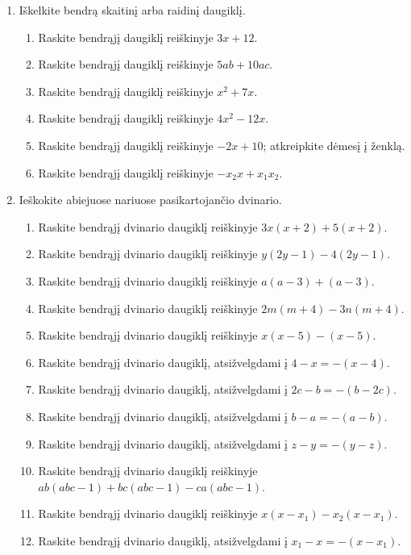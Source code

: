 \documentclass[11pt,a4paper]{scrartcl}
\begin{document}
\begin{enumerate}[label=\textbf{\arabic*.}, leftmargin=*]
    \item Iškelkite bendrą skaitinį arba raidinį daugiklį.
    \begin{enumerate}[label={(\arabic*)}]
        \item Raskite bendrąjį daugiklį reiškinyje $3x+12$.
        \item Raskite bendrąjį daugiklį reiškinyje $5ab+10ac$.
        \item Raskite bendrąjį daugiklį reiškinyje $x^2+7x$.
        \item Raskite bendrąjį daugiklį reiškinyje $4x^2-12x$.
        \item Raskite bendrąjį daugiklį reiškinyje $-2x+10$; atkreipkite dėmesį į ženklą.
        \item Raskite bendrąjį daugiklį reiškinyje $-x_2x+x_1x_2$.
    \end{enumerate}
    \item Ieškokite abiejuose nariuose pasikartojančio dvinario.
    \begin{enumerate}[label={(\arabic*)}]
        \item Raskite bendrąjį dvinario daugiklį reiškinyje $3x(x+2)+5(x+2)$.
        \item Raskite bendrąjį dvinario daugiklį reiškinyje $y(2y-1)-4(2y-1)$.
        \item Raskite bendrąjį dvinario daugiklį reiškinyje $a(a-3)+(a-3)$.
        \item Raskite bendrąjį dvinario daugiklį reiškinyje $2m(m+4)-3n(m+4)$.
        \item Raskite bendrąjį dvinario daugiklį reiškinyje $x(x-5)-(x-5)$.
        \item Raskite bendrąjį dvinario daugiklį, atsižvelgdami į $4-x=-(x-4)$.
        \item Raskite bendrąjį dvinario daugiklį, atsižvelgdami į $2c-b=-(b-2c)$.
        \item Raskite bendrąjį dvinario daugiklį, atsižvelgdami į $b-a=-(a-b)$.
        \item Raskite bendrąjį dvinario daugiklį, atsižvelgdami į $z-y=-(y-z)$.
        \item Raskite bendrąjį dvinario daugiklį reiškinyje $ab(abc-1)+bc(abc-1)-ca(abc-1)$.
        \item Raskite bendrąjį dvinario daugiklį reiškinyje $x(x-x_1)-x_2(x-x_1)$.
        \item Raskite bendrąjį dvinario daugiklį, atsižvelgdami į $x_1-x=-(x-x_1)$.

\end{enumerate}
\end{enumerate}
\end{document}
